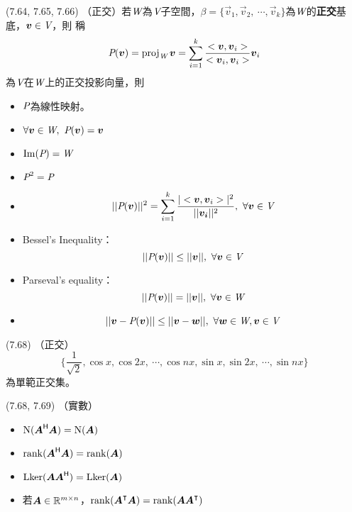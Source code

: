\item \begin{theorem}{(7.64, 7.65, 7.66)} （正交）若$\spc{W}$為$\V$子空間，$\beta = \{\vec{v}_1, \vec{v}_2, \ \cdots, \vec{v}_k\}$為$\spc{W}$的\textbf{正交}基底，$\vec{v} \in \V$，則
	稱
	\begin{equation}
		\P(\vec{v}) = \proj{\spc{W}}{v} = \sum_{i = 1}^{k}\frac{\dotp{\vec{v}}{\vec{v}_i}}{\dotp{\vec{v}_i}{\vec{v}_i}}\vec{v}_i
	\end{equation}
	為$\V$在$\spc{W}$上的正交投影向量，則
	\begin{itemize}
		\item $\P$為線性映射。
		\item $\forall \vec{v} \in \spc{W}, \ \P(\vec{v}) = \vec{v}$
		\item $\im(\P) = \spc{W}$
		\item $\P^2 = \P$
		\item 
		\begin{equation}
			||\P(\vec{v})||^2 = \sum_{i = 1}^{k}\frac{|\dotp{\vec{v}}{\vec{v}_i}|^2}{||\vec{v_i}||^2}, \ \forall \vec{v} \in \V
		\end{equation}
		\item Bessel's Inequality：
		\begin{equation}
			||\P(\vec{v})|| \le ||\vec{v}||, \ \forall \vec{v} \in \V
		\end{equation}
		\item Parseval's equality：
		\begin{equation}
			||\P(\vec{v})|| = ||\vec{v}||, \ \forall \vec{v} \in \spc{W}
		\end{equation}
		\item 
		\begin{equation}
			||\vec{v} - \P(\vec{v})|| \le  ||\vec{v} - \vec{w}||, \ \forall \vec{w} \in \spc{W}, \vec{v} \in \V
		\end{equation}
	\end{itemize}
\end{theorem}

\item \begin{theorem}{(7.68)} （正交）
	\begin{equation}
		\{\frac{1}{\sqrt{2}}, \cos x, \cos 2x, \ \cdots, \cos nx, \sin x, \sin 2x, \ \cdots, \sin nx\}
	\end{equation}
	為單範正交集。
\end{theorem}

\item \begin{theorem}{(7.68, 7.69)} （實數）
	\begin{itemize}
		\item $\Ker(\mat{A}\herm \mat{A}) = \Ker(\mat{A})$
		\item $\rnk(\mat{A}\herm \mat{A}) = \rnk(\mat{A})$
		\item $\lker(\mat{A} \mat{A}\herm) = \lker(\mat{A})$
		\item 若$\mat{A} \in \R^{m \times n}$，$\rnk(\mat{A}^\intercal \mat{A}) = \rnk(\mat{A}\mat{A}^\intercal)$
	\end{itemize}
\end{theorem}

